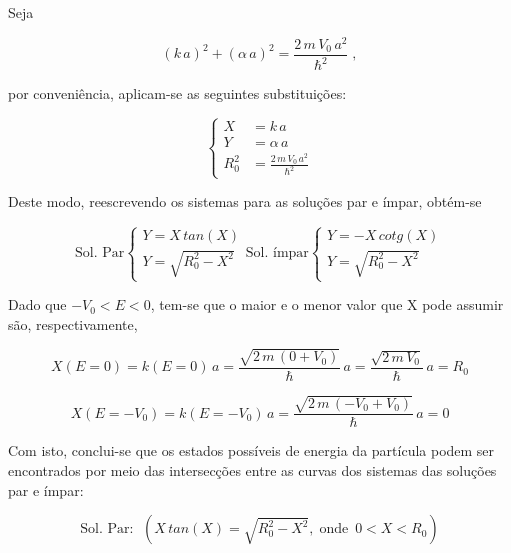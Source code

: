 \noindent Seja

\begin{equation}
	(k\,a)^2 + (\alpha\,a)^2 = \frac{2\,m\,V_0\,a^2}{\hbar^2}\;,
\end{equation}

\noindent por conveniência, aplicam-se as seguintes substituições:

\begin{equation}
	\begin{cases}
		X     & = k\,a                           \\
		Y     & = \alpha\,a                      \\
		R_0^2 & = \frac{2\,m\,V_0\,a^2}{\hbar^2}
	\end{cases}
\end{equation}

Deste modo, reescrevendo os sistemas para as soluções par e ímpar, obtém-se

\begin{equation}
	\mbox{Sol. Par}
	\begin{cases}
		Y = X\,tan(X) \\
		Y = \sqrt{R_0^2 - X^2}
	\end{cases}
	\mbox{Sol. ímpar}
	\begin{cases}
		Y = -X\,cotg(X) \\
		Y = \sqrt{R_0^2 - X^2}
	\end{cases}
\end{equation}

Dado que $-V_0<E<0$, tem-se que o maior e o menor valor que X pode assumir são,
respectivamente,

\begin{equation}
	X(E=0) = k(E=0)\,a = \frac{\sqrt{2\,m\,(0+V_0)}}{\hbar}\,a
	= \frac{\sqrt{2\,m\,V_0}}{\hbar}\,a = R_0
\end{equation}

\begin{equation}
	X(E=-V_0) = k(E=-V_0)\,a = \frac{\sqrt{2\,m\,(-V_0+V_0)}}{\hbar}\,a = 0
\end{equation}

Com isto, conclui-se que os estados possíveis de energia da partícula podem ser
encontrados por meio das intersecções entre as curvas dos sistemas das
soluções par e ímpar:

\begin{equation}
	\mbox{Sol. Par: }\;\left( X\,tan(X)=\sqrt{R_0^2-X^2},\;\mbox{onde
	}\,0<X<R_0 \right)
\end{equation}


